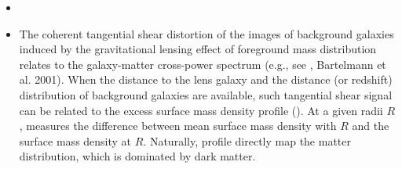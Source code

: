 \documentclass[fleqn,usenatbib,useAMS,english]{mnras}
\begin{document}
\begin{itemize}
        \item {}
        
        \item {}
            The coherent tangential shear distortion of the images of background galaxies 
            induced by the gravitational lensing effect of foreground mass distribution relates
            to the galaxy-matter cross-power spectrum (e.g., see \addref{}, Bartelmann et al.
            2001).
            When the distance to the lens galaxy and the distance (or redshift) distribution 
            of background galaxies are available, such tangential shear signal can be related
            to the excess surface mass density profile (\dsigma{}).
            At a given radii $R$, \dsigma{} measures the difference between mean surface mass 
            density with $R$ and the surface mass density at $R$.
            Naturally, \dsigma{} profile directly map the matter distribution, which is
            dominated by dark matter.


    \end{itemize}

\end{document}
